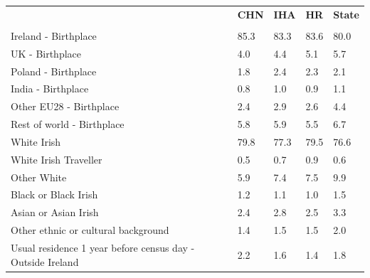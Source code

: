 \documentclass{article}
\begin{document}
\pagebreak
\begin{table}[h]	
\centering
		\begin{tabular}{KTTTT}
  \hline
& \textbf{CHN} & \textbf{IHA} & \textbf{HR}& \textbf{State}\\ 
  \hline
    \\ 
    \hline
Ireland - Birthplace & 85.3& 83.3& 83.6& 80.0\\
UK - Birthplace & 4.0& 4.4& 5.1& 5.7\\
Poland - Birthplace & 1.8& 2.4& 2.3& 2.1\\
India - Birthplace & 0.8& 1.0& 0.9& 1.1\\
Other EU28 - Birthplace & 2.4& 2.9& 2.6& 4.4\\
Rest of world - Birthplace & 5.8& 5.9& 5.5& 6.7\\
    \hline
White Irish & 79.8& 77.3& 79.5& 76.6\\
White Irish Traveller & 0.5& 0.7& 0.9& 0.6\\
Other White & 5.9& 7.4& 7.5& 9.9\\
Black or Black Irish & 1.2& 1.1& 1.0& 1.5\\
Asian or Asian Irish & 2.4& 2.8& 2.5& 3.3\\
Other ethnic or cultural background & 1.4& 1.5& 1.5& 2.0\\
    \hline
Usual residence 1 year before census day - Outside Ireland & 2.2& 1.6& 1.4& 1.8\\


\end{tabular}
\end{table}
\end{document}
